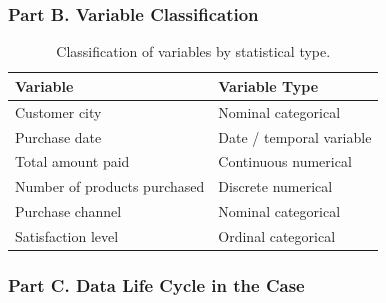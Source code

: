 \documentclass[12pt, a4paper]{article}
\newcommand{\Hcell}[1]{{\color{white}\textbf{#1}}}
\begin{document}
\subsubsection{Part B. Variable Classification}

\begin{table}[H]
\centering
\caption{Classification of variables by statistical type.}
\label{tab:partB}
\small
\begin{tabularx}{\textwidth}{X p{5.5cm}}
\toprule
\rowcolor{aqHdr}
\Hcell{Variable} &
\Hcell{Variable Type} \\
\midrule
Customer city                & Nominal categorical \\
\rowcolor{aqRow}
Purchase date                & Date / temporal variable \\
Total amount paid            & Continuous numerical \\
\rowcolor{aqRow}
Number of products purchased & Discrete numerical \\
Purchase channel             & Nominal categorical \\
\rowcolor{aqRow}
Satisfaction level           & Ordinal categorical \\
\bottomrule
\end{tabularx}
\end{table}

\subsubsection{Part C. Data Life Cycle in the Case}
\end{document}
